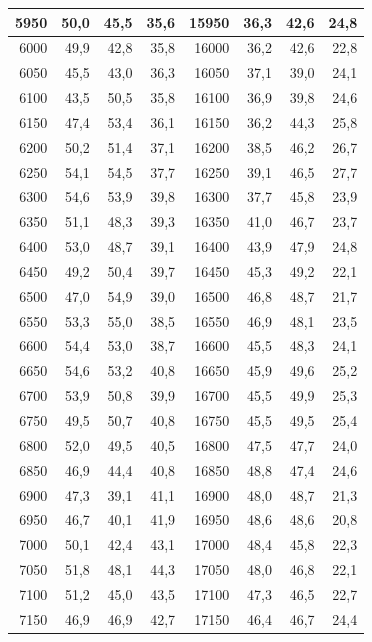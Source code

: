 \begin{small}
\begin{longtable}{|r|r|r|r|r|r|r|r|}
5950 & 50,0 & 45,5 & 35,6 & 15950 & 36,3 & 42,6 & 24,8 \\ \hline
6000 & 49,9 & 42,8 & 35,8 & 16000 & 36,2 & 42,6 & 22,8 \\ \hline
6050 & 45,5 & 43,0 & 36,3 & 16050 & 37,1 & 39,0 & 24,1 \\ \hline
6100 & 43,5 & 50,5 & 35,8 & 16100 & 36,9 & 39,8 & 24,6 \\ \hline
6150 & 47,4 & 53,4 & 36,1 & 16150 & 36,2 & 44,3 & 25,8 \\ \hline
6200 & 50,2 & 51,4 & 37,1 & 16200 & 38,5 & 46,2 & 26,7 \\ \hline
6250 & 54,1 & 54,5 & 37,7 & 16250 & 39,1 & 46,5 & 27,7 \\ \hline
6300 & 54,6 & 53,9 & 39,8 & 16300 & 37,7 & 45,8 & 23,9 \\ \hline
6350 & 51,1 & 48,3 & 39,3 & 16350 & 41,0 & 46,7 & 23,7 \\ \hline
6400 & 53,0 & 48,7 & 39,1 & 16400 & 43,9 & 47,9 & 24,8 \\ \hline
6450 & 49,2 & 50,4 & 39,7 & 16450 & 45,3 & 49,2 & 22,1 \\ \hline
6500 & 47,0 & 54,9 & 39,0 & 16500 & 46,8 & 48,7 & 21,7 \\ \hline
6550 & 53,3 & 55,0 & 38,5 & 16550 & 46,9 & 48,1 & 23,5 \\ \hline
6600 & 54,4 & 53,0 & 38,7 & 16600 & 45,5 & 48,3 & 24,1 \\ \hline
6650 & 54,6 & 53,2 & 40,8 & 16650 & 45,9 & 49,6 & 25,2 \\ \hline
6700 & 53,9 & 50,8 & 39,9 & 16700 & 45,5 & 49,9 & 25,3 \\ \hline
6750 & 49,5 & 50,7 & 40,8 & 16750 & 45,5 & 49,5 & 25,4 \\ \hline
6800 & 52,0 & 49,5 & 40,5 & 16800 & 47,5 & 47,7 & 24,0 \\ \hline
6850 & 46,9 & 44,4 & 40,8 & 16850 & 48,8 & 47,4 & 24,6 \\ \hline
6900 & 47,3 & 39,1 & 41,1 & 16900 & 48,0 & 48,7 & 21,3 \\ \hline
6950 & 46,7 & 40,1 & 41,9 & 16950 & 48,6 & 48,6 & 20,8 \\ \hline
7000 & 50,1 & 42,4 & 43,1 & 17000 & 48,4 & 45,8 & 22,3 \\ \hline
7050 & 51,8 & 48,1 & 44,3 & 17050 & 48,0 & 46,8 & 22,1 \\ \hline
7100 & 51,2 & 45,0 & 43,5 & 17100 & 47,3 & 46,5 & 22,7 \\ \hline
7150 & 46,9 & 46,9 & 42,7 & 17150 & 46,4 & 46,7 & 24,4 \\ \hline

\end{longtable}
\end{small}
